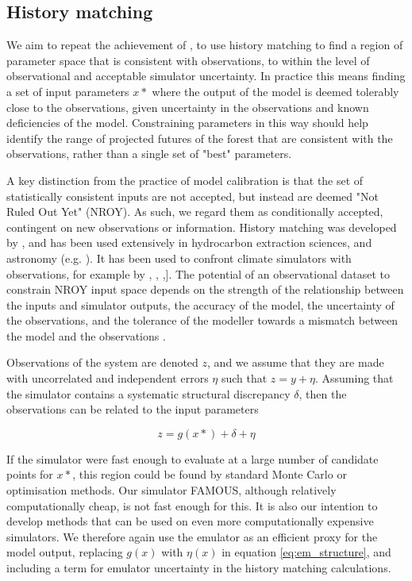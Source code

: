 \documentclass[esd, manuscript]{copernicus}
\begin{document}
\subsection{History matching}\label{historymatching}
We aim to repeat the achievement of \citep{williamson2014identifying}, to use history matching to find a region of parameter space that is consistent with observations, to within the level of observational and acceptable simulator uncertainty. In practice this means finding a set of input parameters $x*$ where the output of the model is deemed tolerably close to the observations, given uncertainty in the observations and known deficiencies of the model. Constraining parameters in this way should help identify the range of projected futures of the forest that are consistent with the observations, rather than a single set of "best" parameters.

A key distinction from the practice of model calibration is that the set of statistically consistent inputs are not accepted, but instead are deemed "Not Ruled Out Yet" (NROY). As such, we regard them as conditionally accepted, contingent on new observations or information. History matching was developed by \citep{craig1997pressure}, and has been used extensively in hydrocarbon extraction sciences, and astronomy (e.g. \citep{vernon2010galaxy}). It has been used to confront climate simulators with observations, for example by \citep{lee2016aerosol}, \citep{williamson2013history}, \citep{ritz2015potential},]. The potential of an observational dataset to constrain NROY input space depends on the strength of the relationship between the inputs and simulator outputs, the accuracy of the model, the uncertainty of the observations, and the tolerance of the modeller towards a mismatch between the model and the observations \citep{mcneall2013potential}.

Observations of the system are denoted $z$, and we assume that they are made with uncorrelated and independent errors $\eta$ such that $z=y+\eta$. Assuming that the simulator contains a systematic structural discrepancy $\delta$, then the observations can be related to the input parameters

\begin{equation}\label{eq:em_structure}
z=g(x*) + \delta + \eta
\end{equation}

If the simulator were fast enough to evaluate at a large number of candidate points for $x*$, this region could be found by standard Monte Carlo or optimisation methods. Our simulator FAMOUS, although relatively computationally cheap, is not fast enough for this. It is also our intention to develop methods that can be used on even more computationally expensive simulators. We therefore again use the emulator as an efficient proxy for the model output, replacing $g(x)$ with $\eta(x)$ in equation \ref{eq:em_structure}, and including a term for emulator uncertainty in the history matching calculations.
\end{document}
